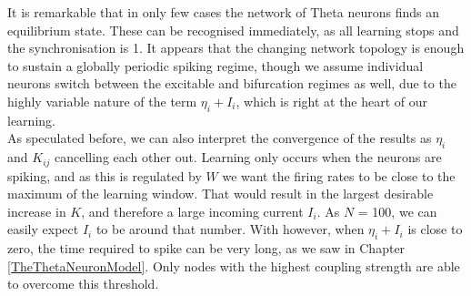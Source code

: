 It is remarkable that in only few cases the network of Theta neurons finds an equilibrium state. These can be recognised immediately, as all learning stops and the synchronisation is 1. It appears that the changing network topology is enough to sustain a globally periodic spiking regime, though we assume individual neurons switch between the excitable and bifurcation regimes as well, due to the highly variable nature of the term $\eta_i + I_i$, which is right at the heart of our learning. \\

As speculated before, we can also interpret the convergence of the results as $\eta_i$ and $K_{ij}$ cancelling each other out. Learning only occurs when the neurons are spiking, and as this is regulated by $W$ we want the firing rates to be close to the maximum of the learning window. That would result in the largest desirable increase in $K$, and therefore a large incoming current $I_i$. As $N$ = 100, we can easily expect $I_i$ to be around that number. With \IP however, when $\eta_i + I_i$ is close to zero, the time required to spike can be very long, as we saw in Chapter \ref{TheThetaNeuronModel}. Only nodes with the highest coupling strength are able to overcome this threshold.

